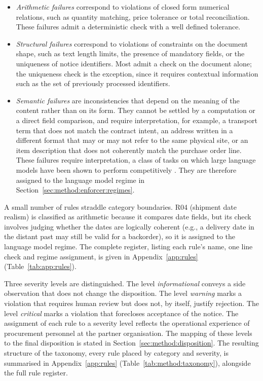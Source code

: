 \begin{itemize}
  \item \emph{Arithmetic failures} correspond to violations of closed form numerical relations, such as quantity matching, price tolerance or total reconciliation. These failures admit a deterministic check with a well defined tolerance.
  \item \emph{Structural failures} correspond to violations of constraints on the document shape, such as text length limits, the presence of mandatory fields, or the uniqueness of notice identifiers. Most admit a check on the document alone; the uniqueness check is the exception, since it requires contextual information such as the set of previously processed identifiers.
  \item \emph{Semantic failures} are inconsistencies that depend on the meaning of the content rather than on its form. They cannot be settled by a computation or a direct field comparison, and require interpretation, for example, a transport term that does not match the contract intent, an address written in a different format that may or may not refer to the same physical site, or an item description that does not coherently match the purchase order line. These failures require interpretation, a class of tasks on which large language models have been shown to perform competitively \citep{brown2020,bubeck2023}. They are therefore assigned to the language model regime in Section~\ref{sec:method:enforcer:regimes}.
\end{itemize}

A small number of rules straddle category boundaries. R04 (shipment date realism) is classified as arithmetic because it compares date fields, but its check involves judging whether the dates are logically coherent (e.g., a delivery date in the distant past may still be valid for a backorder), so it is assigned to the language model regime. The complete register, listing each rule's name, one line check and regime assignment, is given in Appendix~\ref{app:rules} (Table~\ref{tab:app:rules}).

Three severity levels are distinguished. The level \emph{informational} conveys a side observation that does not change the disposition. The level \emph{warning} marks a violation that requires human review but does not, by itself, justify rejection. The level \emph{critical} marks a violation that forecloses acceptance of the notice. The assignment of each rule to a severity level reflects the operational experience of procurement personnel at the partner organisation. The mapping of these levels to the final disposition is stated in Section~\ref{sec:method:disposition}. The resulting structure of the taxonomy, every rule placed by category and severity, is summarised in Appendix~\ref{app:rules} (Table~\ref{tab:method:taxonomy}), alongside the full rule register.



